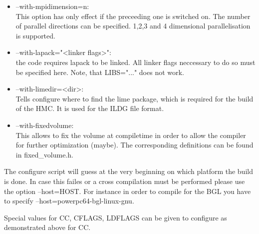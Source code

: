 \begin{itemize}
\item {\ttfamily --with-mpidimension=n}:\\
  This option has only effect if the preceeding one is switched
  on. The number of parallel directions can be specified. 1,2,3 and 4
  dimensional parallelisation is supported.

\item {\ttfamily --with-lapack="<linker flags>"}:\\
  the code requires lapack to be linked. All linker flags neccessary
  to do so must be specified here. Note, that {\ttfamily LIBS="..."}
  does not work.

\item {\ttfamily --with-limedir=<dir>}:\\
 Tells configure where to find the lime package, which is required for
 the build of the HMC. It is used for the ILDG file format.

\item {\ttfamily --with-fixedvolume}:\\
  This allows to fix the volume at compiletime in order to allow the
  compiler for further optimization (maybe). The corresponding
  definitions can be found in {\ttfamily fixed\_volume.h}.


\end{itemize}

The configure script will guess at the very beginning on which
platform the build is done. In case this failes or a cross compilation
must be performed please use the option {\ttfamily --host=HOST}. For
instance in order to compile for the BGL you have to specify
{\ttfamily --host=powerpc64-bgl-linux-gnu}.

Special values for {\ttfamily CC, CFLAGS, LDFLAGS} can be given to
configure as demonstrated above for {\ttfamily CC}.


